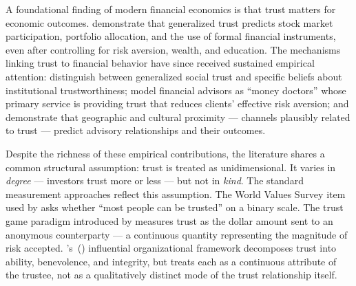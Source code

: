 

A foundational finding of modern financial economics is that trust matters for economic outcomes. \citet{GuisoSapienza2004, GuisoSapienza2008} demonstrate that generalized trust predicts stock market participation, portfolio allocation, and the use of formal financial instruments, even after controlling for risk aversion, wealth, and education. The mechanisms linking trust to financial behavior have since received sustained empirical attention: \citet{SapenzaZingales2012} distinguish between generalized social trust and specific beliefs about institutional trustworthiness; \citet{GennaioliShleiferVishny2015} model financial advisors as ``money doctors'' whose primary service is providing trust that reduces clients' effective risk aversion; and \citet{GurunStoffmanYonker2018} demonstrate that geographic and cultural proximity --- channels plausibly related to trust --- predict advisory relationships and their outcomes.

Despite the richness of these empirical contributions, the literature shares a common structural assumption: trust is treated as unidimensional. It varies in \textit{degree} --- investors trust more or less --- but not in \textit{kind}. The standard measurement approaches reflect this assumption. The World Values Survey item used by \citeauthor{GuisoSapienza2004} asks whether ``most people can be trusted'' on a binary scale. The trust game paradigm introduced by \citet{BergDickhautMcCabe1995} measures trust as the dollar amount sent to an anonymous counterparty --- a continuous quantity representing the magnitude of risk accepted. \citeauthor{MayerDavisSchoorman1995}'s~(\citeyear{MayerDavisSchoorman1995}) influential organizational framework decomposes trust into ability, benevolence, and integrity, but treats each as a continuous attribute of the trustee, not as a qualitatively distinct mode of the trust relationship itself.

